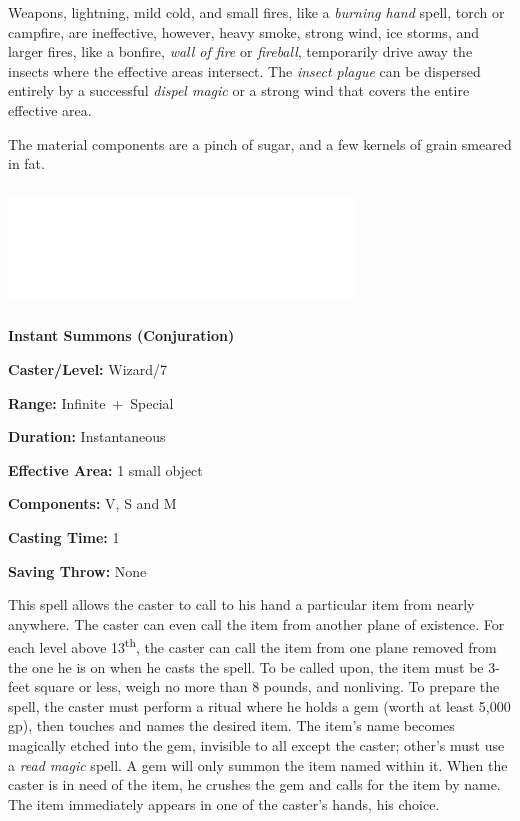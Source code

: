 \begin{multicols}{2}
Weapons, lightning, mild cold, and small fires, like a \textit{burning hand} spell, torch or campfire, are ineffective, however, heavy smoke, strong wind, ice storms, and larger fires, like a bonfire, \textit{wall of fire} or \textit{fireball}, temporarily drive away the insects where the effective areas intersect.  The \textit{insect plague} can be dispersed entirely by a successful \textit{dispel magic} or a strong wind that covers the entire effective area.

The material components are a pinch of sugar, and a few kernels of grain smeared in fat.

\noindent\includegraphics[width=3.6in, height=1.25in]{testblock.pdf}

\vspace{1em}

\noindent
\begin{minipage}{\columnwidth}

\noindent \textbf{Instant Summons (Conjuration)}

\noindent \textbf{Caster/Level:} Wizard/7

\noindent \textbf{Range:} Infinite~+~Special

\noindent \textbf{Duration:} Instantaneous

\noindent \textbf{Effective Area:} 1 small object

\noindent \textbf{Components:} V, S and M

\noindent \textbf{Casting Time:} 1

\noindent \textbf{Saving Throw:} None

\end{minipage}

This spell allows the caster to call to his hand a particular item from nearly anywhere.  The caster can even call the item from another plane of existence.  For each level above 13\textsuperscript{th}, the caster can call the item from one plane removed from the one he is on when he casts the spell.  To be called upon, the item must be 3-feet square or less, weigh no more than 8 pounds, and nonliving.  To prepare the spell, the caster must perform a ritual where he holds a gem (worth at least 5,000 gp), then touches and names the desired item.  The item's name becomes magically etched into the gem, invisible to all except the caster; other's must use a \textit{read magic} spell.  A gem will only summon the item named within it.  When the caster is in need of the item, he crushes the gem and calls for the item by name.  The item immediately appears in one of the caster's hands, his choice.


\end{multicols}
